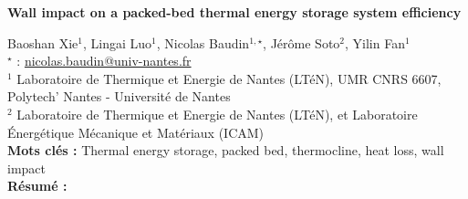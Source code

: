 


    \newpage

\BgThispage

%
\begin{flushleft}
\addtocounter{section}{1}
{\Large \textbf{Wall impact on a packed-bed thermal energy storage system efficiency}}\label{ref:45}
\end{flushleft}
%
Baoshan Xie$^{1}$, Lingai Luo$^{1}$, Nicolas Baudin$^{1,\star}$, Jérôme Soto$^{2}$, Yilin Fan$^{1}$\\[2mm]
$^{\star}$ \Letter : \url{nicolas.baudin@univ-nantes.fr}\\[2mm]
{\footnotesize $^{1}$  Laboratoire de Thermique et Energie de Nantes (LTéN), UMR CNRS 6607, Polytech' Nantes - Université de Nantes}\\
{\footnotesize $^{2}$ Laboratoire de Thermique et Energie de Nantes (LTéN), et Laboratoire     Énergétique Mécanique et Matériaux (ICAM)}\\
[4mm]
%
\noindent \textbf{Mots clés : } Thermal energy storage, packed bed, thermocline, heat loss, wall impact\\[4mm]
%
\noindent \textbf{Résumé : } 

